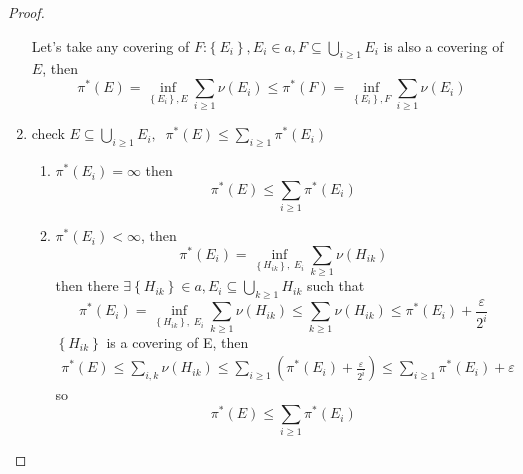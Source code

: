 \begin{proof}
\begin{enumerate}
		Let's take any covering of $ F $:$\left\{ {{E_i}} \right\},{E_i} \in a,F \subseteq \bigcup\limits_{i \geqslant 1} {{E_i}} $ is also a covering of $ E $, then
		\begin{equation}
		{\pi ^*}\left( E \right) = \mathop {\inf }\limits_{\left\{ {{E_i}} \right\},E} \sum\limits_{i \geqslant 1} {\nu \left( {{E_i}} \right)}  \leqslant {\pi ^*}\left( F \right) = \mathop {\inf }\limits_{\left\{ {{E_i}} \right\},F} \sum\limits_{i \geqslant 1} {\nu \left( {{E_i}} \right)} 
		\label{eq4.11}
		\end{equation}
		\item check $E \subseteq \bigcup\limits_{i \geqslant 1} {{E_i}} ,\;\;{\pi ^*}\left( E \right) \leqslant \sum\limits_{i \geqslant 1} {{\pi ^*}\left( {{E_i}} \right)} $
		\begin{enumerate}
			\item ${\pi ^*}\left( {{E_i}} \right) = \infty $ then 
			\begin{equation}
			{\pi ^*}\left( E \right) \leqslant \sum\limits_{i \geqslant 1} {{\pi ^*}\left( {{E_i}} \right)}
			\label{eq4.12}
			\end{equation}
			\item ${\pi ^*}\left( {{E_i}} \right) < \infty $, then
			\begin{equation}
			{\pi ^*}\left( {{E_i}} \right) = \mathop {\inf }\limits_{\left\{ {{H_{ik}}} \right\},\;{E_i}} \sum\limits_{k \geqslant 1} {\nu \left( {{H_{ik}}} \right)} 
			\label{eq4.13}
			\end{equation}
			then there $\exists \left\{ {{H_{ik}}} \right\} \in a,{E_i} \subseteq \bigcup\limits_{k \geqslant 1} {{H_{ik}}} $ such that
			\begin{equation}
			{\pi ^*}\left( {{E_i}} \right) = \mathop {\inf }\limits_{\left\{ {{H_{ik}}} \right\},\;{E_i}} \sum\limits_{k \geqslant 1} {\nu \left( {{H_{ik}}} \right)}  \leqslant \sum\limits_{k \geqslant 1} {\nu \left( {{H_{ik}}} \right)}  \leqslant {\pi ^*}\left( {{E_i}} \right) + \frac{\varepsilon }{{{2^i}}}
			\label{eq4.14}
			\end{equation}
			$\left\{ {{H_{ik}}} \right\}$ is a covering of E, then
			\begin{equation}
			\begin{split}
			{\pi ^*}\left( E \right) \leqslant \sum\limits_{i,k} {\nu \left( {{H_{ik}}} \right)}  \leqslant \sum\limits_{i \geqslant 1} {\left( {{\pi ^*}\left( {{E_i}} \right) + \frac{\varepsilon }{{{2^i}}}} \right)}  \leqslant \sum\limits_{i \geqslant 1} {{\pi ^*}\left( {{E_i}} \right) + \varepsilon } 
			\end{split}
			\label{eq4.15}
			\end{equation}
			so 
			\begin{equation}
			{\pi ^*}\left( E \right) \leqslant \sum\limits_{i \geqslant 1} {{\pi ^*}\left( {{E_i}} \right)} 
			\label{eq4.16}
			\end{equation}
		\end{enumerate}
	\end{enumerate}
\end{proof}

